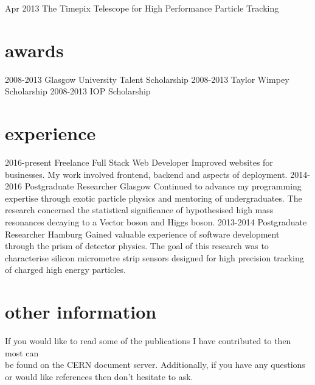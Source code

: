 \documentclass[]{twentysecondcv}
\begin{document}
\begin{twentyshort}
  \twentyitemshort
    {Apr 2013}
    {The Timepix Telescope for High Performance Particle Tracking }
\end{twentyshort}



\section{awards}

\begin{twentyshort}
  \twentyitemshort
    {2008-2013}
    {Glasgow University Talent Scholarship }
  \twentyitemshort
    {2008-2013}
    {Taylor Wimpey Scholarship }
  \twentyitemshort
    {2008-2013}
    {IOP Scholarship}
\end{twentyshort}


\section{experience}

\begin{twenty}
  \twentyitem
    {2016-present}
    {Freelance Full Stack Web Developer}
    {}
    {Improved websites for businesses. My work involved frontend, backend and aspects of deployment.}
  \twentyitem
    {2014-2016}
    {Postgraduate Researcher}
    {Glasgow}
    {Continued to advance my programming expertise through exotic particle physics and mentoring of undergraduates.  The research concerned the  statistical significance of hypothesised high mass resonances decaying to a Vector boson and Higgs boson.}
\twentyitem
    {2013-2014}
    {Postgraduate Researcher}
    {Hamburg}
    {Gained valuable experience of software development through the prism of detector physics.  The goal of this research was to  characterise silicon micrometre strip sensors designed for high precision tracking of charged high energy particles.}

\end{twenty}
\section{other information}
\hspace*{5pt}
If you would like to read some of the publications I have contributed to then most can \\ \hspace*{5pt} be found on the CERN document server. Additionally, if you have any questions \\ \hspace*{5pt} or would like references then don't hesitate to ask. \\ 
\hspace*{5pt}
\vspace*{2pt}

\end{document}
